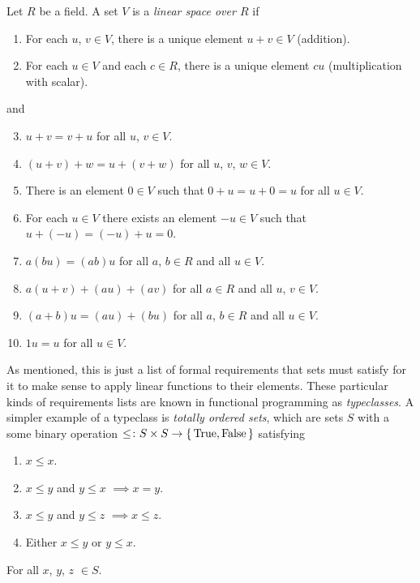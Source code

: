 \documentclass[english, 12pt]{article}
\begin{document}
\begin{definition}\label{def:linear_space}
	Let $R$ be a field.
	A set $V$ is a \emph{linear space over $R$} if
	\begin{enumerate}
		\item For each $u$, $v \in V$, there is a unique element $u + v \in V$ (addition).
		\item For each $u \in V$ and each $c \in R$, there is a unique element $c u$ (multiplication with scalar).
	\end{enumerate}
	and
	\begin{enumerate}
		\setcounter{enumi}{2}
		\item $u + v = v + u$ for all $u$, $v \in V$.
		\item $(u + v) + w = u + (v + w)$ for all $u$, $v$, $w \in V$.
		\item There is an element $\mathit 0 \in V$ such that $\mathit 0 + u = u + \mathit 0 = u$ for all $u \in V$.
		\item For each $u \in V$ there exists an element $-u \in V$ such that $u + (-u) = (-u) + u = \mathit 0$.
		\item $a(b u) = (a b) u$ for all $a$, $b \in R$ and all $u \in V$.
		\item $a (u + v) + (a u) + (a v)$ for all $a \in R$ and all $u$, $v \in V$.
		\item $(a + b) u = (a u) + (b u)$ for all $a$, $b \in R$ and all $u \in V$.
		\item $1 u = u$ for all $u \in V$.
	\end{enumerate}
\end{definition}

As mentioned, this is just a list of formal requirements that sets must satisfy for it to make sense to apply linear functions to their elements.
These particular kinds of requirements lists are known in functional programming as \emph{typeclasses}.
A simpler example of a typeclass is \emph{totally ordered sets}, which are sets $S$ with a some binary operation $\leq \colon S \times S \to \set{\textrm{True}, \textrm{False}}$ satisfying
\begin{enumerate}
	\item $x \leq x$.
	\item $x \leq y$ and $y \leq x$ $\implies x = y$.
	\item $x \leq y$ and $y \leq z$ $\implies x \leq z$.
	\item Either $x \leq y$ or $y \leq x$.
\end{enumerate}
For all $x$, $y$, $z$ $\in S$.
\end{document}
